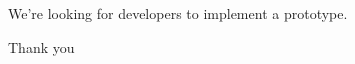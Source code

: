 \documentclass[17pt]{beamer}
\begin{document}

\begin{frame}
We're looking for developers to implement a prototype.

\vspace*{1cm}
\Large{\centerline{Thank you}}

\end{frame}
\end{document}
